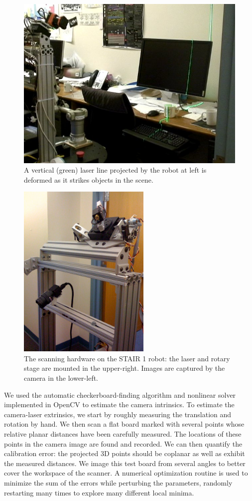 \documentclass[letterpaper, 10 pt, conference]{ieeeconf}  %
\begin{document}
\begin{figure}[t]
\begin{center}
  \includegraphics[width=0.83\linewidth]{borg-line.jpg}
\end{center}
\caption{A vertical (green) laser line projected by the robot at left is deformed
as it strikes objects in the scene.}
\label{fig:sample_line}
\end{figure}
\begin{figure}[t]
\begin{center}
  \includegraphics[width=2.5in]{borg2.jpg}
\end{center}
\caption{The scanning hardware on the STAIR 1 robot: the laser and rotary stage are mounted in the upper-right. Images are captured by the camera in the lower-left.}
\label{fig:borg2}
\end{figure}
We used the automatic checkerboard-finding
algorithm and nonlinear solver implemented in OpenCV \cite{bib:opencv} to
estimate the camera intrinsics. To estimate the camera-laser extrinsics, we
start by roughly measuring the translation and rotation by hand. We then scan 
a flat board marked with several points whose relative planar distances have
been carefully measured. The locations of these points in the camera image are
found and recorded. We can then quantify the calibration error: the projected
3D points should be coplanar as well as exhibit the measured distances. We
image this test board from several angles to better cover the workspace of
the scanner. A numerical optimization routine is used to minimize the sum of
the errors while perturbing the parameters, randomly restarting many times to
explore many different local minima.
\end{document}
